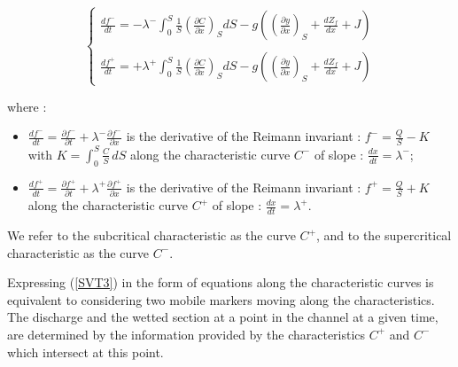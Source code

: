 \begin{equation}
 \label{SVT4}
 \left \lbrace
  \begin{array}{l}
    \frac{df^-}{dt} = - \lambda^- \int_{0}^S \frac{1}{S} \left ( \frac{\partial C}{\partial x}\right )_S dS - g \left ( \left ( \frac{\partial y}{\partial x} \right )_S + \frac{dZ_f}{dx} + J \right ) \\
    \\
    \frac{df^+}{dt} = + \lambda^+ \int_{0}^S \frac{1}{S} \left ( \frac{\partial C}{\partial x}\right )_S dS - g \left ( \left ( \frac{\partial y}{\partial x} \right )_S + \frac{dZ_f}{dx} + J \right )
  \end{array}
 \right.
\end{equation}

where :
\begin{itemize}
 \item $\frac{df^-}{dt} = \frac{\partial f^-}{\partial t} + \lambda^- \frac{\partial f^-}{\partial x}$ is the derivative of the Reimann invariant : $f^- = \frac{Q}{S} - K$ with $K = \int_{0}^S \frac{C}{S} \, dS$ along the characteristic curve $C^-$ of slope : $\frac{dx}{dt} = \lambda^-$;
 \item $\frac{df^+}{dt} = \frac{\partial f^+}{\partial t} + \lambda^+ \frac{\partial f^+}{\partial x}$ is the derivative of the Reimann invariant : $f^+ = \frac{Q}{S} + K$ along the characteristic curve $C^+$ of slope : $\frac{dx}{dt} = \lambda^+$.
\end{itemize}

\vspace{0.5cm}

We refer to the subcritical characteristic as the curve $C^+$, and to the supercritical characteristic as the curve $C^-$.

\vspace{0.5cm}

Expressing (\ref{SVT3}) in the form of equations along the characteristic curves is equivalent to considering two mobile markers moving along the characteristics. The discharge and the wetted section at a point in the channel at a given time, are determined by the information provided by the characteristics $C^+$ and $C^-$ which intersect at this point.

